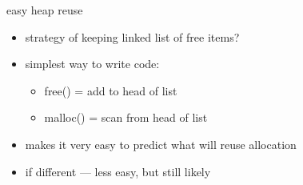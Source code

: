 \begin{frame}{easy heap reuse}
    \begin{itemize}
    \item strategy of keeping linked list of free items?
    \item simplest way to write code:
        \begin{itemize}
        \item free() = add to head of list
        \item malloc() = scan from head of list
        \end{itemize}
    \item makes it very easy to predict what will reuse allocation
    \item if different --- less easy, but still likely
    \end{itemize}
\end{frame}
